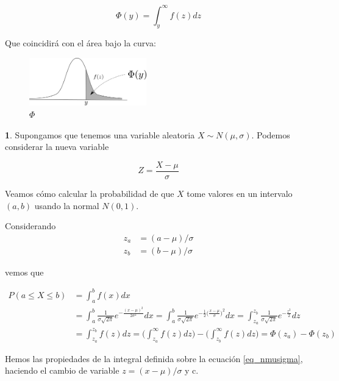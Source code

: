 \documentclass[]{book}
\theoremstyle{plain}
\theoremstyle{definition}
\theoremstyle{definition} %
\newcommand{\thistheoremname}{}
\newtheorem{genericthm}[theorem]{\thistheoremname}
\newenvironment{customdef}[1]
  {\renewcommand{\thistheoremname}{#1}%
   \begin{genericthm}}
  {\end{genericthm}}
\begin{document}
\begin{equation}\label{eq_phi_norm}
  \Phi(y) = \int^{\infty}_{y} f(z)dz
\end{equation}
 

Que coincidirá con el área bajo
la curva:
 
\begin{figure}[htbp]
  \centering
  \includegraphics[width=2in,height=\textheight]{img/drawing_phi.png}
  \caption{$\Phi$}
\end{figure} 


\begin{customdef}{Uso de la Normal $N(0,1)$ para calcular probabilidades de normales $N(\mu, \sigma)$}

Supongamos que tenemos una variable aleatoria $X \sim N(\mu, \sigma)$. Podemos considerar la nueva variable

\[Z = \frac{X-\mu}{\sigma}\]

Veamos cómo calcular la probabilidad de que $X$ tome valores en un intervalo $(a, b)$ usando la normal $N(0,1)$.

Considerando  
\begin{align*}
  z_a &=(a-\mu)/\sigma\\
  z_b&=(b-\mu)/\sigma
\end{align*}

 vemos que 

\begin{align*}
    P(a\leq X\leq b)&= \int^b_a f(x) dx \\
    &= \int^b_a \frac{1}{\sigma \sqrt{2\pi}} e^{-\frac{(x-\mu)^2}{2\sigma^2}} dx
    = \int^{b}_{a} \frac{1}{\sigma \sqrt{2\pi}} e^{-\frac{1}{2}\big(\frac{x-\mu}{\sigma}\big)^2} dx
    = \int^{z_b}_{z_a} \frac{1}{\sigma \sqrt{2\pi}} e^{-\frac{z^2}{2}} dz\\ 
    &= \int^{z_b}_{z_a} f(z) dz = \bigg(\int^{\infty}_{z_a} f(z) dz\bigg) - \bigg(\int^{\infty}_{z_b} f(z) dz\bigg)  = \Phi(z_a) - \Phi(z_b)
\end{align*}

Hemos las propiedades de la integral definida sobre la ecuación \ref{eq_nmusigma}, haciendo el cambio de
variable $z=(x-\mu)/\sigma$ y c.
\end{customdef}
\end{document}
